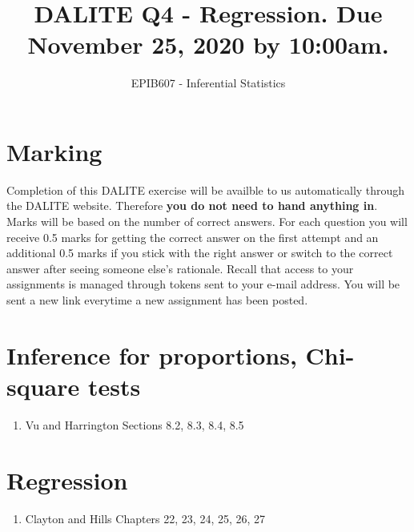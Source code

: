 \documentclass[letterpaper,10pt,twocolumn,twoside,]{pinp}
\title{DALITE Q4 - Regression. Due November 25, 2020 by 10:00am.}
\author[a]{EPIB607 - Inferential Statistics}
\affil[a]{Fall 2020, McGill University}
\begin{document}
\verticaladjustment{-2pt}

\maketitle
\thispagestyle{firststyle}



\hypertarget{marking}{%
\section*{Marking}\label{marking}}

Completion of this DALITE exercise will be availble to us automatically
through the DALITE website. Therefore \textbf{you do not need to hand
anything in}. Marks will be based on the number of correct answers. For
each question you will receive 0.5 marks for getting the correct answer
on the first attempt and an additional 0.5 marks if you stick with the
right answer or switch to the correct answer after seeing someone else's
rationale. Recall that access to your assignments is managed through
tokens sent to your e-mail address. You will be sent a new link
everytime a new assignment has been posted.

\hypertarget{inference-for-proportions-chi-square-tests}{%
\section{Inference for proportions, Chi-square
tests}\label{inference-for-proportions-chi-square-tests}}

\begin{enumerate}
\item Vu and Harrington Sections 8.2, 8.3, 8.4, 8.5
\end{enumerate}

\vspace*{0.25cm}

\hypertarget{regression}{%
\section{Regression}\label{regression}}

\begin{enumerate}
\item Clayton and Hills Chapters 22, 23, 24, 25, 26, 27
\end{enumerate}





\end{document}

